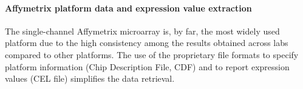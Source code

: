 














\paragraph{Affymetrix platform data and expression value extraction}


%
The single-channel Affymetrix microarray is, by far, the most widely used
platform due to the high consistency among the results obtained across labs
compared to other platforms\cite{Irizarry2005}.
%
The use of the proprietary file formats to specify platform information (Chip
Description File, CDF) and to report expression values (CEL file) simplifies
the data retrieval.


